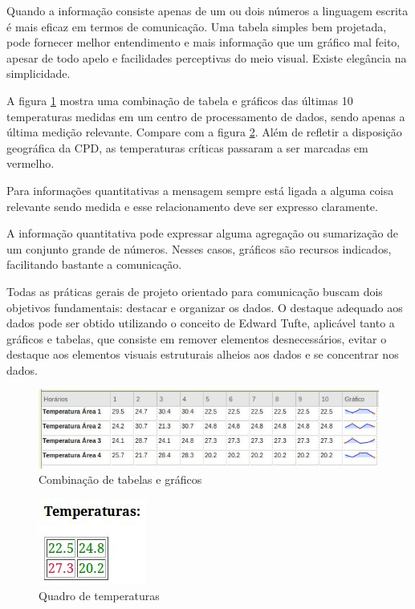 \documentclass[]{article}
\begin{document}
Quando a informação consiste apenas de um ou dois números a linguagem escrita é mais eficaz em termos de comunicação. Uma tabela simples bem projetada, pode fornecer melhor entendimento e mais informação que um gráfico mal feito, apesar de todo apelo e facilidades perceptivas do meio visual. Existe elegância na simplicidade. \cite{few2012show}

A figura \ref{fig:tabgraf1}  mostra uma combinação de tabela e gráficos das últimas 10 temperaturas medidas em um centro de processamento de dados, sendo apenas a última medição relevante. Compare com a figura \ref{fig:quadrotemp}. Além de refletir a disposição geográfica da CPD, as temperaturas críticas passaram a ser marcadas em vermelho.

Para informações quantitativas a mensagem sempre está ligada a alguma coisa relevante sendo medida e esse relacionamento deve ser expresso claramente.

A informação quantitativa pode expressar alguma agregação ou sumarização de um conjunto grande de números. Nesses casos, gráficos são recursos indicados, facilitando bastante a comunicação.

Todas as práticas gerais de projeto orientado para comunicação buscam dois objetivos fundamentais: destacar e organizar os dados.
O destaque adequado aos dados pode ser obtido utilizando o conceito de Edward Tufte, aplicável tanto a gráficos e  tabelas, que consiste em remover elementos desnecessários, evitar o destaque aos elementos visuais estruturais alheios aos dados e se concentrar nos dados. \cite{tufte1983visual}

\begin{figure}
\centering
\includegraphics[scale=.5]{./tabgraf1}
\caption{Combinação de tabelas e gráficos}
\label{fig:tabgraf1}
\end{figure}

\begin{figure}
\centering
\includegraphics[scale=1]{./quadrotemp}
\caption{Quadro de temperaturas}
\label{fig:quadrotemp}
\end{figure}
\end{document}
